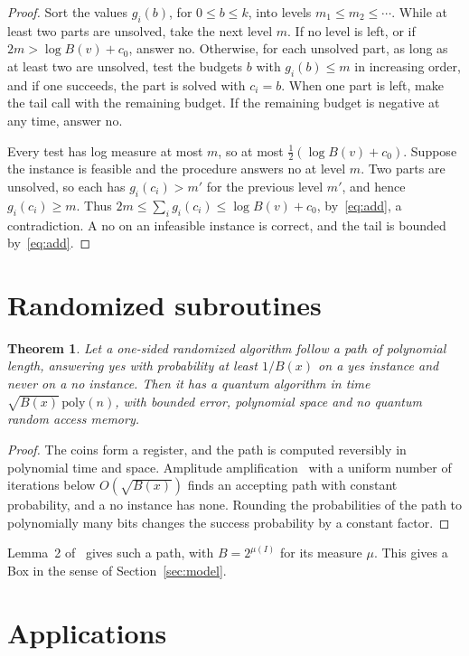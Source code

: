 \documentclass[11pt]{article}
\newtheorem{theorem}{Theorem}[section]
\theoremstyle{definition}
\theoremstyle{remark}
\newcommand{\poly}{\mathrm{poly}}
\begin{document}
\begin{proof}
Sort the values $g_i(b)$, for $0\le b\le k$, into levels $m_1\le m_2\le\cdots$. While at least two parts are unsolved, take the next level $m$. If no level is left, or if $2m>\log B(v)+c_0$, answer no. Otherwise, for each unsolved part, as long as at least two are unsolved, test the budgets $b$ with $g_i(b)\le m$ in increasing order, and if one succeeds, the part is solved with $c_i=b$. When one part is left, make the tail call with the remaining budget. If the remaining budget is negative at any time, answer no.

Every test has log measure at most $m$, so at most $\frac12(\log B(v)+c_0)$. Suppose the instance is feasible and the procedure answers no at level $m$. Two parts are unsolved, so each has $g_i(c_i)>m'$ for the previous level $m'$, and hence $g_i(c_i)\ge m$. Thus $2m\le\sum_ig_i(c_i)\le\log B(v)+c_0$, by~\eqref{eq:add}, a contradiction. A no on an infeasible instance is correct, and the tail is bounded by~\eqref{eq:add}. \end{proof}

\section{Randomized subroutines}\label{sec:random}

\begin{theorem}\label{thm:random}
Let a one-sided randomized algorithm follow a path of polynomial length, answering yes with probability at least $1/B(x)$ on a yes instance and never on a no instance. Then it has a quantum algorithm in time $\sqrt{B(x)}\,\poly(n)$, with bounded error, polynomial space and no quantum random access memory.
\end{theorem}

\begin{proof}
The coins form a register, and the path is computed reversibly in polynomial time and space. Amplitude amplification~\cite{BHMT02} with a uniform number of iterations below $O(\sqrt{B(x)})$ finds an accepting path with constant probability, and a no instance has none. Rounding the probabilities of the path to polynomially many bits changes the success probability by a constant factor. \end{proof}

Lemma~2 of~\cite{CGHMZ25} gives such a path, with $B=2^{\mu(I)}$ for its measure $\mu$. This gives a Box in the sense of Section~\ref{sec:model}.

\section{Applications}\label{sec:app}
\end{document}
